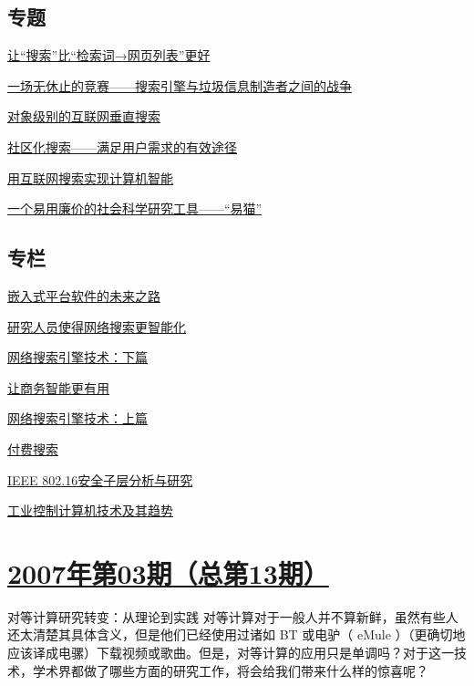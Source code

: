 \documentclass[a4paper]{article}
\begin{document}
\subsection{专题}
\href{http://history.ccf.org.cn/resources/1190201776262/2010/04/15/014016.pdf}{让“搜索”比“检索词→网页列表”更好}

\href{http://history.ccf.org.cn/resources/1190201776262/2010/04/15/014018.pdf}{一场无休止的竞赛——搜索引擎与垃圾信息制造者之间的战争}

\href{http://history.ccf.org.cn/resources/1190201776262/2010/04/15/014024.pdf}{对象级别的互联网垂直搜索}

\href{http://history.ccf.org.cn/resources/1190201776262/2010/04/15/014029.pdf}{社区化搜索——满足用户需求的有效途径}

\href{http://history.ccf.org.cn/resources/1190201776262/2010/04/15/014034.pdf}{用互联网搜索实现计算机智能}

\href{http://history.ccf.org.cn/resources/1190201776262/2010/04/15/014039.pdf}{一个易用廉价的社会科学研究工具——“易猫”}

\subsection{专栏}
\href{http://history.ccf.org.cn/resources/1190201776262/2010/04/15/014084.pdf}{嵌入式平台软件的未来之路}

\href{http://history.ccf.org.cn/resources/1190201776262/2010/04/15/014044.pdf}{研究人员使得网络搜索更智能化}

\href{http://history.ccf.org.cn/resources/1190201776262/2010/04/15/014056.pdf}{网络搜索引擎技术：下篇}

\href{http://history.ccf.org.cn/resources/1190201776262/2010/04/15/014060.pdf}{让商务智能更有用}

\href{http://history.ccf.org.cn/resources/1190201776262/2010/04/15/014052.pdf}{网络搜索引擎技术：上篇}

\href{http://history.ccf.org.cn/resources/1190201776262/2010/04/15/014048.pdf}{付费搜索}

\href{http://history.ccf.org.cn/resources/1190201776262/2010/04/15/014064.pdf}{IEEE 802.16安全子层分析与研究}

\href{http://history.ccf.org.cn/resources/1190201776262/2010/04/15/014073.pdf}{工业控制计算机技术及其趋势}


\section{\href{http://history.ccf.org.cn/sites/ccf/jsjtbbd.jsp?contentId=2542567628956}{\textbf{2007年第03期（总第13期）}}}
对等计算研究转变：从理论到实践 对等计算对于一般人并不算新鲜，虽然有些人还太清楚其具体含义，但是他们已经使用过诸如 BT 或电驴（ eMule ）（更确切地应该译成电骡）下载视频或歌曲。但是，对等计算的应用只是单调吗？对于这一技术，学术界都做了哪些方面的研究工作，将会给我们带来什么样的惊喜呢？
\end{document}
